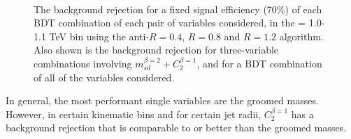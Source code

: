 \begin{figure}
\centering
{}
\\
\caption{The background rejection
for a fixed signal efficiency (70\%) of each BDT combination of
each pair of variables considered, in the \pT = 1.0-1.1 TeV bin using
the anti-\kT $R=0.4$, $R=0.8$ and $R=1.2$ algorithm. Also shown is the background
rejection for three-variable combinations involving $m_{sd}^{\beta=2} +
C_2^{\beta=1}$, and for a BDT combination of all of the variables considered.}
\label{fig:pt1000_comb2D}
\end{figure}



In general, the most performant single variables are
the groomed masses. However, in certain kinematic bins and for certain
jet radii, $C_2^{\beta=1}$ has a background rejection that is
comparable to or better than the groomed masses. 

